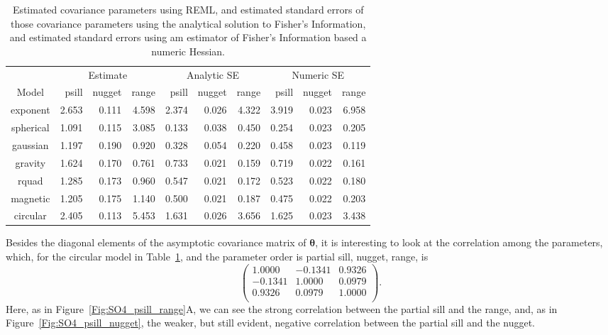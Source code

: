\documentclass[12pt, titlepage]{article}
\begin{document}
\begin{table}[H] 
				\caption{Estimated covariance parameters using REML, and estimated standard errors of those covariance parameters using the analytical solution to Fisher's Information, and estimated standard errors using am estimator of Fisher's Information based a numeric Hessian.\label{tab:AsySE}}
\begin{center}
\begin{tabular}{|c|rrr|rrr|rrr|}
  \hline
  \hline{}
  & \multicolumn{3}{c|}{Estimate} & \multicolumn{3}{c|}{Analytic SE} & \multicolumn{3}{c|}{Numeric SE}\\
  Model & psill & nugget & range & psill & nugget & range & psill & nugget & range \\
	\hline
  \hline
exponent & 2.653 & 0.111 & 4.598 & 2.374 & 0.026 & 4.322 & 3.919 & 0.023 & 6.958 \\ 
  spherical & 1.091 & 0.115 & 3.085 & 0.133 & 0.038 & 0.450 & 0.254 & 0.023 & 0.205 \\ 
  gaussian & 1.197 & 0.190 & 0.920 & 0.328 & 0.054 & 0.220 & 0.458 & 0.023 & 0.119 \\ 
  gravity & 1.624 & 0.170 & 0.761 & 0.733 & 0.021 & 0.159 & 0.719 & 0.022 & 0.161 \\ 
  rquad & 1.285 & 0.173 & 0.960 & 0.547 & 0.021 & 0.172 & 0.523 & 0.022 & 0.180 \\ 
  magnetic & 1.205 & 0.175 & 1.140 & 0.500 & 0.021 & 0.187 & 0.475 & 0.022 & 0.203 \\ 
  circular & 2.405 & 0.113 & 5.453 & 1.631 & 0.026 & 3.656 & 1.625 & 0.023 & 3.438 \\ 
  \hline
  \hline
\end{tabular}
\end{center}
\end{table}

Besides the diagonal elements of the asymptotic covariance matrix of $\boldsymbol{\theta}$, it is interesting to look at the correlation among the parameters, which, for the circular model in Table~\ref{tab:AsySE}, and the parameter order is partial sill, nugget, range, is 
$$
\left(
\begin{array}{ccc}
1.0000 & -0.1341 & 0.9326 \\ 
  -0.1341 & 1.0000 & 0.0979 \\ 
  0.9326 & 0.0979 & 1.0000 \\ 
\end{array}
\right).
$$
Here, as in Figure~\ref{Fig:SO4_psill_range}A, we can see the strong correlation between the partial sill and the range, and, as in Figure~\ref{Fig:SO4_psill_nugget}, the weaker, but still evident, negative correlation between the partial sill and the nugget.
  
\end{document}
